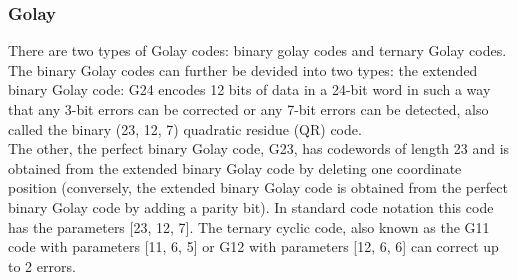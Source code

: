 \subsubsection{Golay}
There are two types of Golay codes: binary golay codes and ternary Golay codes. \\
The binary Golay codes can further be devided into two types: the extended binary Golay code: G24 encodes 12 bits of data in a 24-bit word in such a way that any 3-bit errors can be corrected or any 7-bit errors can be detected, also called the binary (23, 12, 7) quadratic residue (QR) code.\\
The other, the perfect binary Golay code, G23, has codewords of length 23 and is obtained from the extended binary Golay code by deleting one coordinate position (conversely, the extended binary Golay code is obtained from the perfect binary Golay code by adding a parity bit). In standard code notation this code has the parameters [23, 12, 7].
The ternary cyclic code, also known as the G11 code with parameters [11, 6, 5] or G12 with parameters [12, 6, 6] can correct up to 2 errors.
%
%
%
